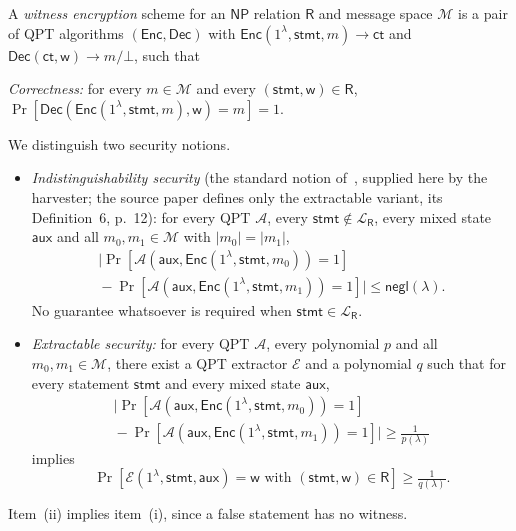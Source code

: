 \documentclass{aicr-conjecture}
\newcommand{\negl}{\mathsf{negl}}
\newcommand{\NP}{\mathsf{NP}}
\newcommand{\Rel}{\mathsf{R}}
\newcommand{\Msp}{\mathcal{M}}
\newcommand{\Lang}{\mathcal{L}}
\newcommand{\Enc}{\mathsf{Enc}}
\newcommand{\Dec}{\mathsf{Dec}}
\newcommand{\ct}{\mathsf{ct}}
\newcommand{\stmt}{\mathsf{stmt}}
\newcommand{\wit}{\mathsf{w}}
\newcommand{\aux}{\mathsf{aux}}
\begin{document}
\begin{definition}\label{def:we}
A \emph{witness encryption} scheme for an $\NP$ relation $\Rel$ and
message space $\Msp$ is a pair of QPT algorithms $(\Enc, \Dec)$ with
$\Enc(1^{\lambda}, \stmt, m) \to \ct$ and $\Dec(\ct, \wit) \to
m/\bot$, such that

\emph{Correctness:} for every $m \in \Msp$ and every $(\stmt, \wit)
\in \Rel$, $\Pr[\Dec(\Enc(1^{\lambda}, \stmt, m), \wit) = m] = 1$.

We distinguish two security notions.
\begin{itemize}[leftmargin=1.6em]
  \item[(i)] \emph{Indistinguishability security} (the standard
    notion of~\cite{GGSW13}, supplied here by the harvester; the
    source paper defines only the extractable variant, its
    Definition~6, p.~12): for every QPT $\mathcal{A}$, every $\stmt
    \notin \Lang_{\Rel}$, every mixed state $\aux$ and all $m_{0},
    m_{1} \in \Msp$ with $\lvert m_{0} \rvert = \lvert m_{1} \rvert$,
  \begin{multline*}
    \bigl| \Pr[\mathcal{A}(\aux, \Enc(1^{\lambda}, \stmt, m_{0}))
      = 1] \\
    {}- \Pr[\mathcal{A}(\aux, \Enc(1^{\lambda}, \stmt, m_{1}))
      = 1] \bigr| \le \negl(\lambda).
  \end{multline*}
  No guarantee whatsoever is required when $\stmt \in \Lang_{\Rel}$.
  \item[(ii)] \emph{Extractable security:} for every QPT
    $\mathcal{A}$, every polynomial $p$ and all $m_{0}, m_{1} \in
    \Msp$, there exist a QPT extractor $\mathcal{E}$ and a polynomial
    $q$ such that for every statement $\stmt$ and every mixed state
    $\aux$,
  \begin{multline*}
    \bigl| \Pr[\mathcal{A}(\aux, \Enc(1^{\lambda}, \stmt, m_{0}))
      = 1] \\
    {}- \Pr[\mathcal{A}(\aux, \Enc(1^{\lambda}, \stmt, m_{1}))
      = 1] \bigr| \ge \tfrac{1}{p(\lambda)}
  \end{multline*}
  implies
  \[
    \Pr[\mathcal{E}(1^{\lambda}, \stmt, \aux) = \wit
      \text{ with } (\stmt, \wit) \in \Rel] \ge \tfrac{1}{q(\lambda)}.
  \]
\end{itemize}
Item~(ii) implies item~(i), since a false statement has no witness.
\end{definition}
\end{document}

